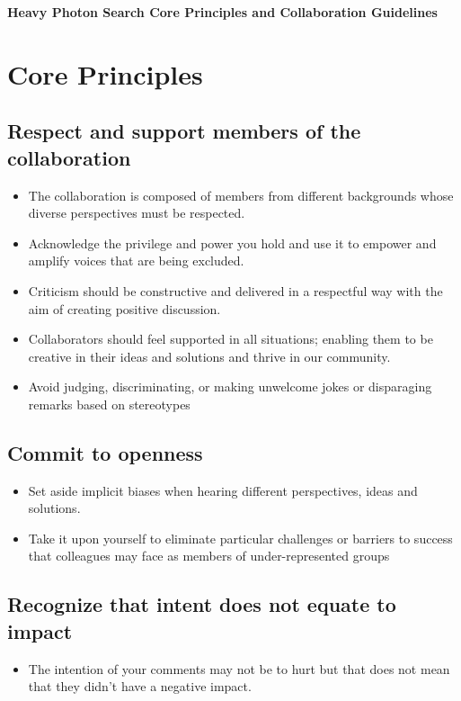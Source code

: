 \documentclass[12pt]{article}
\begin{document}
\begin{center}
\Large
\textbf{Heavy Photon Search Core Principles and Collaboration Guidelines}
\end{center}

\normalsize
\tableofcontents
\clearpage

\section{Core Principles}

\subsection{Respect and support members of the collaboration}
\begin{itemize}
    \item The collaboration is composed of members from different backgrounds whose
    diverse perspectives must be respected. 
    \item Acknowledge the privilege and power you hold and use it to empower 
    and amplify voices that are being excluded. 
    \item Criticism should be constructive and delivered in a respectful way
    with the aim of creating positive discussion. 
    \item Collaborators should feel supported in all situations; enabling 
    them to be creative in their ideas and solutions and thrive in our 
    community. 
    \item Avoid judging, discriminating, or making unwelcome jokes or disparaging remarks based on stereotypes
\end{itemize}

\subsection{Commit to openness}
\begin{itemize}
    \item Set aside implicit biases when hearing different perspectives, ideas and solutions.   
    \item Take it upon yourself to eliminate particular challenges or barriers to success that colleagues may face as members of under-represented groups
\end{itemize}

\subsection{Recognize that intent does not equate to impact}
\begin{itemize}
    \item The intention of your comments may not be to hurt but that does not
    mean that they didn't have a negative impact. 
\end{itemize}
\end{document}
